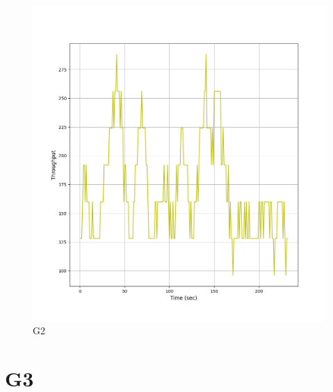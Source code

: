 \documentclass[hidelinks, 12pt, a4paper]{article}
\begin{document}
\begin{figure}[h!]
\centering
	\includegraphics[height=.38\textheight, width=\textwidth]{assets/session2/g2.png}
	\caption{G2} 
\end{figure}


\section{G3}
\end{document}
